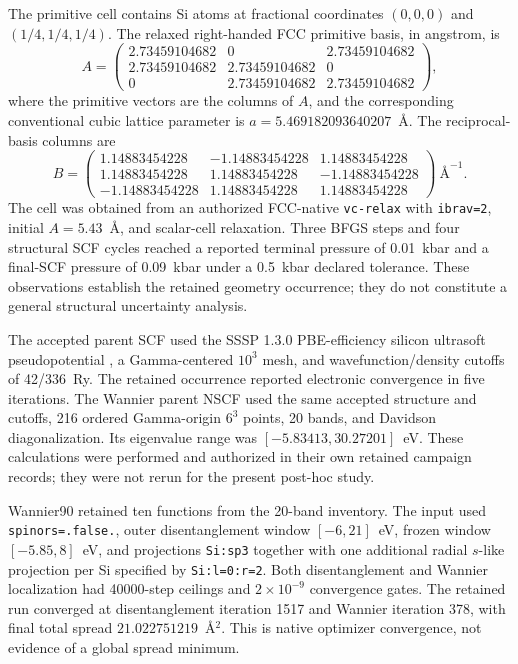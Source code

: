 \documentclass[11pt]{article}
\theoremstyle{definition}
\begin{document}
The primitive cell contains Si atoms at fractional coordinates $(0,0,0)$ and
$(1/4,1/4,1/4)$.  The relaxed right-handed FCC primitive basis, in angstrom, is
\begin{equation}
 A=\begin{pmatrix}
 2.73459104682&0&2.73459104682\\
 2.73459104682&2.73459104682&0\\
 0&2.73459104682&2.73459104682
 \end{pmatrix},
 \label{eq:silicon-direct-basis}
\end{equation}
where the primitive vectors are the columns of $A$, and the corresponding conventional
cubic lattice parameter is
$a=5.469182093640207$~\AA.  The reciprocal-basis columns are
\begin{equation}
 B=\begin{pmatrix}
 1.14883454228&-1.14883454228&1.14883454228\\
 1.14883454228&1.14883454228&-1.14883454228\\
 -1.14883454228&1.14883454228&1.14883454228
 \end{pmatrix}\ \text{\AA}^{-1}.
 \label{eq:silicon-reciprocal-basis}
\end{equation}
The cell was obtained from an authorized FCC-native \texttt{vc-relax} with
\texttt{ibrav=2}, initial $A=5.43$~\AA, and scalar-cell relaxation.  Three BFGS steps
and four structural SCF cycles reached a reported terminal pressure of 0.01~kbar and a
final-SCF pressure of 0.09~kbar under a 0.5~kbar declared tolerance.  These observations
establish the retained geometry occurrence; they do not constitute a general structural
uncertainty analysis.

The accepted parent SCF used the SSSP 1.3.0 PBE-efficiency silicon ultrasoft
pseudopotential \cite{prandini2018}, a Gamma-centered $10^3$ mesh, and wavefunction/density cutoffs of
42/336~Ry.  The retained occurrence reported electronic convergence in five iterations.
The Wannier parent NSCF used the same accepted structure and cutoffs, 216 ordered
Gamma-origin $6^3$ points, 20 bands, and Davidson diagonalization.  Its eigenvalue range
was $[-5.83413,30.27201]$~eV.  These calculations were performed and authorized in their
own retained campaign records; they were not rerun for the present post-hoc study.

Wannier90 retained ten functions from the 20-band inventory.  The input used
\texttt{spinors=.false.}, outer disentanglement window $[-6,21]$~eV, frozen window
$[-5.85,8]$~eV, and projections \texttt{Si:sp3} together with one additional radial
$s$-like projection per Si specified by \texttt{Si:l=0:r=2}.  Both disentanglement and
Wannier localization had 40000-step ceilings and $2\times10^{-9}$ convergence gates.
The retained run converged at disentanglement iteration 1517 and Wannier iteration 378,
with final total spread $21.022751219$~\AA$^2$.  This is native optimizer convergence,
not evidence of a global spread minimum.
\end{document}

